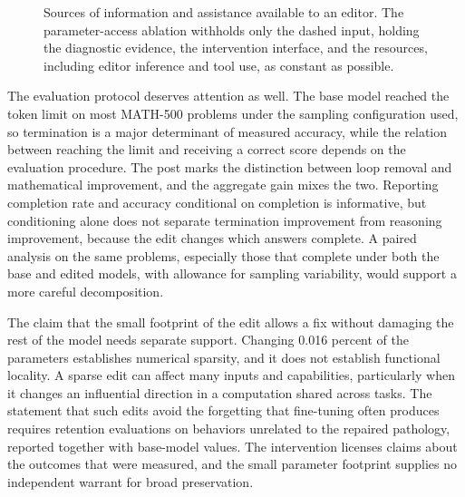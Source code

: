 \documentclass[11pt]{article}
\begin{document}
\begin{figure}[htbp]
\centering
{}
\caption{Sources of information and assistance available to an editor. The parameter-access ablation withholds only the dashed input, holding the diagnostic evidence, the intervention interface, and the resources, including editor inference and tool use, as constant as possible.}
\label{fig:attribution}
\end{figure}

The evaluation protocol deserves attention as well. The base model reached the token limit on most MATH-500 problems under the sampling configuration used, so termination is a major determinant of measured accuracy, while the relation between reaching the limit and receiving a correct score depends on the evaluation procedure. The post marks the distinction between loop removal and mathematical improvement, and the aggregate gain mixes the two. Reporting completion rate and accuracy conditional on completion is informative, but conditioning alone does not separate termination improvement from reasoning improvement, because the edit changes which answers complete. A paired analysis on the same problems, especially those that complete under both the base and edited models, with allowance for sampling variability, would support a more careful decomposition.

The claim that the small footprint of the edit allows a fix without damaging the rest of the model needs separate support. Changing 0.016 percent of the parameters establishes numerical sparsity, and it does not establish functional locality. A sparse edit can affect many inputs and capabilities, particularly when it changes an influential direction in a computation shared across tasks. The statement that such edits avoid the forgetting that fine-tuning often produces requires retention evaluations on behaviors unrelated to the repaired pathology, reported together with base-model values. The intervention licenses claims about the outcomes that were measured, and the small parameter footprint supplies no independent warrant for broad preservation.
\end{document}
